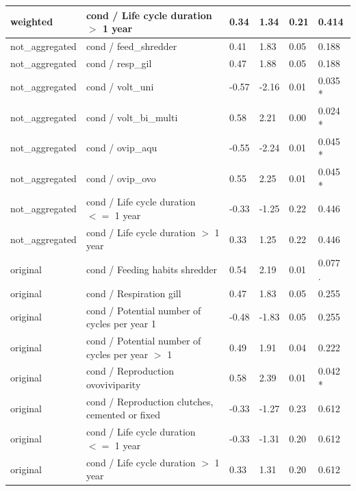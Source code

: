 \documentclass[12pt]{article}
\begin{document}
\begin{longtable}[H]{m{2.6cm}|m{7.3cm}|m{1cm}|m{1.4cm}|m{1.5cm}|m{1.5cm}}
      weighted & cond / Life cycle duration $>$ 1 year & 0.34 & 1.34 & 0.21 & 0.414 \\
      \midrule 
      not\_aggregated & cond / feed\_shredder & 0.41 & 1.83 & 0.05 & 0.188 \\ 
      not\_aggregated & cond / resp\_gil & 0.47 & 1.88 & 0.05 & 0.188 \\ 
      not\_aggregated & cond / volt\_uni & -0.57 & -2.16 & 0.01 & 0.035 * \\ 
      not\_aggregated & cond / volt\_bi\_multi & 0.58 & 2.21 & 0.00 & 0.024 * \\ 
      not\_aggregated & cond / ovip\_aqu & -0.55 & -2.24 & 0.01 & 0.045 * \\ 
      not\_aggregated & cond / ovip\_ovo & 0.55 & 2.25 & 0.01 & 0.045 * \\ 
      not\_aggregated & cond / Life cycle duration $<=$ 1 year & -0.33 & -1.25 & 0.22 & 0.446 \\ 
      not\_aggregated & cond / Life cycle duration $>$ 1 year & 0.33 & 1.25 & 0.22 & 0.446 \\
      \midrule 
      original & cond / Feeding habits shredder & 0.54 & 2.19 & 0.01 & 0.077 . \\
      original & cond / Respiration gill & 0.47 & 1.83 & 0.05 & 0.255 \\ 
      original & cond / Potential number of cycles per year 1 & -0.48 & -1.83 & 0.05 & 0.255 \\ 
      original & cond / Potential number of cycles per year $>$ 1 & 0.49 & 1.91 & 0.04 & 0.222 \\
      original & cond / Reproduction ovoviviparity & 0.58 & 2.39 & 0.01 & 0.042 * \\ 
      original & cond / Reproduction clutches, cemented or fixed & -0.33 & -1.27 & 0.23 & 0.612 \\
      original & cond / Life cycle duration $<=$ 1 year & -0.33 & -1.31 & 0.20 & 0.612 \\ 
      original & cond / Life cycle duration $>$ 1 year & 0.33 & 1.31 & 0.20 & 0.612 \\          
      \bottomrule
\end{longtable}
\end{document}
